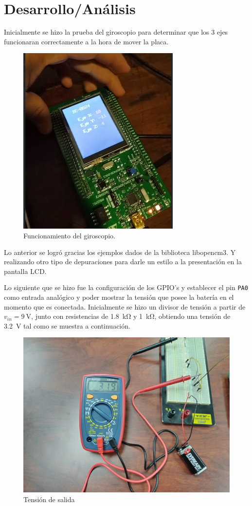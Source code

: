 \section{Desarrollo/Análisis}

Inicialmente se hizo la prueba del giroscopio para determinar que los 3 ejes funcionaran correctamente a la hora de mover la placa.
\begin{figure}[H]
\centering
\includegraphics[width=.55\linewidth]{Imagenes/5.png}
 \caption{Funcionamiento del giroscopio.}
 \label{fig_gyro}
\end{figure}
Lo anterior se logró gracias los ejemplos dados de la biblioteca libopencm3. Y realizando otro tipo de depuraciones para darle un estilo a la presentación en la pantalla LCD.\par
Lo siguiente que se hizo fue la configuración de los GPIO's y establecer el pin \texttt{PA0} como entrada analógico y poder mostrar la tensión que posee la batería en el momento que es conectada. Inicialmente se hizo un divisor de tensión a partir de $v_{in}=\SI{9}{\volt}$, junto con resistencias de \SI{1.8}{\kilo\ohm} y \SI{1}{\kilo\ohm}, obtiendo una tensión de \SI{3.2}{\volt} tal como se muestra a continuación.
\begin{figure}[H]
\centering
\includegraphics[width=.55\linewidth]{Imagenes/6.jpeg}
 \caption{Tensión de salida}
 \label{fig_vout}
\end{figure}
